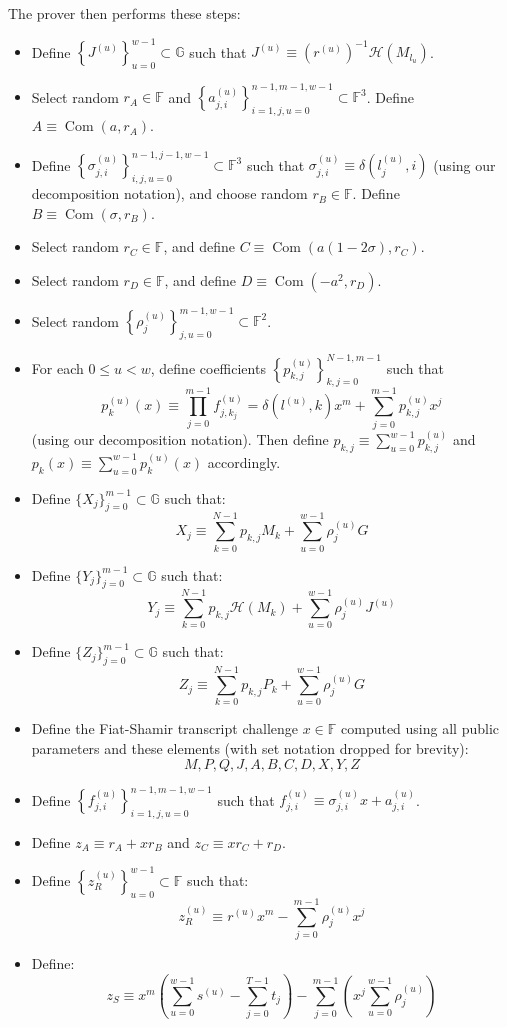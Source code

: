 \documentclass[draft]{article}
\newcommand{\G}{\mathbb{G}}
\newcommand{\F}{\mathbb{F}}
\newcommand{\hp}{\mathcal{H}}
\newcommand{\com}{\operatorname{Com}}
\newcommand{\sumj}{\sum_{j=0}^{m-1}}
\newcommand{\sumk}{\sum_{k=0}^{N-1}}
\newcommand{\sumu}{\sum_{u=0}^{w-1}}
\begin{document}
The prover then performs these steps:
\begin{itemize}
\item Define $\left\{J^{(u)}\right\}_{u=0}^{w-1} \subset \G$ such that $J^{(u)} \equiv (r^{(u)})^{-1}\hp(M_{l_u})$.
\item Select random $r_A \in \F$ and $\left\{a^{(u)}_{j,i}\right\}_{i=1,j,u=0}^{n-1,m-1,w-1} \subset \F^3$. Define $A \equiv \com(a,r_A)$.
\item Define $\left\{\sigma^{(u)}_{j,i}\right\}_{i,j,u=0}^{n-1,j-1,w-1} \subset \F^3$ such that $\sigma^{(u)}_{j,i} \equiv \delta\left(l^{(u)}_j,i\right)$ (using our decomposition notation), and choose random $r_B \in \F$. Define $B \equiv \com(\sigma,r_B)$.
\item Select random $r_C \in \F$, and define $C \equiv \com(a(1-2\sigma), r_C)$.
\item Select random $r_D \in \F$, and define $D \equiv \com(-a^2, r_D)$.
\item Select random $\left\{\rho^{(u)}_j\right\}_{j,u=0}^{m-1,w-1} \subset \F^2$.
\item For each $0 \leq u < w$, define coefficients $\left\{p^{(u)}_{k,j}\right\}_{k,j=0}^{N-1,m-1}$ such that $$p^{(u)}_k(x) \equiv \prod_{j=0}^{m-1} f^{(u)}_{j,k_j} = \delta\left(l^{(u)},k\right)x^m + \sumj p^{(u)}_{k,j}x^j$$ (using our decomposition notation). Then define $p_{k,j} \equiv \sumu p^{(u)}_{k,j}$ and $p_k(x) \equiv \sumu p^{(u)}_k(x)$ accordingly.
\item Define $\{X_j\}_{j=0}^{m-1} \subset \G$ such that: $$X_j \equiv \sumk p_{k,j}M_k + \sumu \rho^{(u)}_jG$$
\item Define $\{Y_j\}_{j=0}^{m-1} \subset \G$ such that: $$Y_j \equiv \sumk p_{k,j}\hp(M_k) + \sumu \rho^{(u)}_jJ^{(u)}$$
\item Define $\{Z_j\}_{j=0}^{m-1} \subset \G$ such that: $$Z_j \equiv \sumk p_{k,j}P_k + \sumu \rho^{(u)}_jG$$
\item Define the Fiat-Shamir transcript challenge $x \in \F$ computed using all public parameters and these elements (with set notation dropped for brevity): $$M,P,Q,J,A,B,C,D,X,Y,Z$$
\item Define $\left\{f^{(u)}_{j,i}\right\}_{i=1,j,u=0}^{n-1,m-1,w-1}$ such that $f^{(u)}_{j,i} \equiv \sigma^{(u)}_{j,i}x + a^{(u)}_{j,i}$.
\item Define $z_A \equiv r_A + xr_B$ and $z_C \equiv xr_C + r_D$.
\item Define $\left\{z^{(u)}_R\right\}_{u=0}^{w-1} \subset \F$ such that: $$z^{(u)}_R \equiv r^{(u)}x^m - \sumj \rho^{(u)}_jx^j$$
\item Define: $$z_S \equiv x^m\left( \sumu s^{(u)} - \sum_{j=0}^{T-1} t_j \right) - \sumj \left(x^j \sumu \rho^{(u)}_j\right)$$
\end{itemize}
\end{document}
